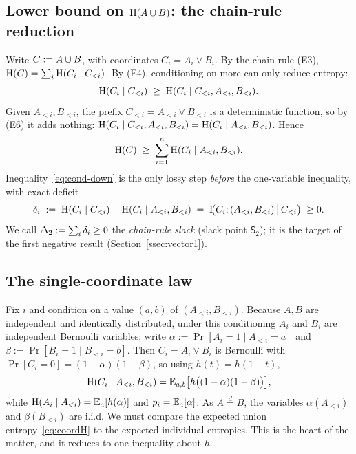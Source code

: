 \documentclass[11pt]{amsart}
\theoremstyle{definition}
\theoremstyle{remark}
\begin{document}
\subsection{Lower bound on \texorpdfstring{$\operatorname{H}(A\cup B)$}{H(A cup B)}: the chain-rule reduction}
\label{ssec:chain}
Write $C:=A\cup B$, with coordinates $C_i=A_i\vee B_i$. By the chain rule (E3),
$\operatorname{H}(C)=\sum_i\operatorname{H}(C_i\mid C_{<i})$. By (E4), conditioning on more can only
reduce entropy:
\begin{equation}\label{eq:cond-down}
   \operatorname{H}(C_i\mid C_{<i})\;\ge\;\operatorname{H}(C_i\mid C_{<i},A_{<i},B_{<i}).
\end{equation}
Given $A_{<i},B_{<i}$, the prefix $C_{<i}=A_{<i}\vee B_{<i}$ is a deterministic
function, so by (E6) it adds nothing:
$\operatorname{H}(C_i\mid C_{<i},A_{<i},B_{<i})=\operatorname{H}(C_i\mid A_{<i},B_{<i})$. Hence
\begin{equation}\label{eq:chainLB}
   \operatorname{H}(C)\;\ge\;\sum_{i=1}^n \operatorname{H}(C_i\mid A_{<i},B_{<i}).
\end{equation}
Inequality~\eqref{eq:cond-down} is the only lossy step \emph{before} the
one-variable inequality, with exact deficit
\begin{equation}\label{eq:delta-i}
   \delta_i \;:=\; \operatorname{H}(C_i\mid C_{<i})-\operatorname{H}(C_i\mid A_{<i},B_{<i})
   \;=\; \operatorname{I}\!\bigl(C_i;(A_{<i},B_{<i})\,\big|\,C_{<i}\bigr)\;\ge 0 .
\end{equation}
We call $\Delta_2:=\sum_i\delta_i\ge 0$ the \emph{chain-rule slack} (slack point
$\mathsf S_2$); it is the target of the first negative result
(Section~\ref{ssec:vector1}).

\subsection{The single-coordinate law}\label{ssec:coord}
Fix $i$ and condition on a value $(a,b)$ of $(A_{<i},B_{<i})$. Because $A,B$ are
independent and identically distributed, under this conditioning $A_i$ and $B_i$
are independent Bernoulli variables; write
$\alpha:=\Pr[A_i=1\mid A_{<i}=a]$ and $\beta:=\Pr[B_i=1\mid B_{<i}=b]$. Then
$C_i=A_i\vee B_i$ is Bernoulli with $\Pr[C_i=0]= (1-\alpha)(1-\beta)$, so using
$h(t)=h(1-t)$,
\begin{equation}\label{eq:coordH}
   \operatorname{H}(C_i\mid A_{<i},B_{<i})=\mathbb{E}_{a,b}\bigl[h\bigl((1-\alpha)(1-\beta)\bigr)\bigr],
\end{equation}
while $\operatorname{H}(A_i\mid A_{<i})=\mathbb{E}_a[h(\alpha)]$ and $p_i=\mathbb{E}_a[\alpha]$. As $A\overset
d=B$, the variables $\alpha(A_{<i})$ and $\beta(B_{<i})$ are i.i.d. We must
compare the expected union entropy~\eqref{eq:coordH} to the expected individual
entropies. This is the heart of the matter, and it reduces to one inequality
about $h$.
\end{document}
